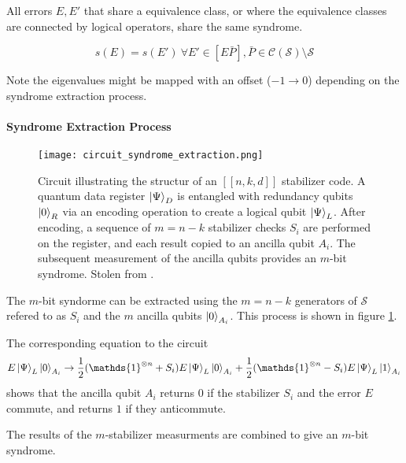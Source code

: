 All errors $E,E'$ that share a equivalence class, 
or where the equivalence classes are connected by logical operators,
share the same syndrome.

\begin{equation}
        s(E) = s(E')\  \forall E' \in [E\bar{P}],\bar{P}\in \mathcal{C}(\mathcal{S}) \setminus \mathcal{S}
\end{equation}

Note the eigenvalues might be mapped with an offset ($-1\rightarrow 0$) depending on the syndrome extraction process.

\paragraph{Syndrome Extraction Process}\label{sec:basic.qc.syndrome_extraction_process}
\begin{figure}[h]
    \begin{center}
        \texttt{[image: circuit\_syndrome\_extraction.png]}
    \end{center}
    \caption{
        Circuit illustrating the structur of an $[[n,k,d]]$ stabilizer code. 
        A quantum data register $\ket{\Psi}_D$ is entangled with redundancy qubits $\ket{0}_R$ via an encoding operation to create a logical qubit $\ket{\Psi}_L$.
        After encoding, a sequence of $m = n - k$ stabilizer checks $S_i$ are performed on the register, and each result copied to an ancilla qubit $A_i$.         
        The subsequent measurement of the ancilla qubits provides an $m$-bit syndrome.
        Stolen from \cite{QECintro}.
    }
    \label{fig:basic.qc.syndrome_extraction.circuit}
\end{figure}
The $m$-bit syndorme can be extracted using the $m=n-k$ generators of $\mathcal{S}$ refered to as $S_i$
and the $m$ ancilla qubits $\ket{0}_{A_i}$.
This process is shown in figure \ref{fig:basic.qc.syndrome_extraction.circuit}. \cite{QECintro}

The corresponding equation to the circuit
\begin{equation}
    E \ket{\Psi}_L \ket{0}_{A_i} \rightarrow \frac{1}{2} (\mathds{1}^{\otimes n} + S_i) E \ket{\Psi}_L \ket{0}_{A_i} +  \frac{1}{2} (\mathds{1}^{\otimes n} - S_i) E   \ket{\Psi}_L \ket{1}_{A_i} 
\end{equation}
shows that the ancilla qubit $A_i$ returns $0$ if the stabilizer $S_i$ and the error $E$ commute,
and returns $1$ if they anticommute.

The results of the $m$-stabilizer measurments are combined to give an $m$-bit syndrome.


